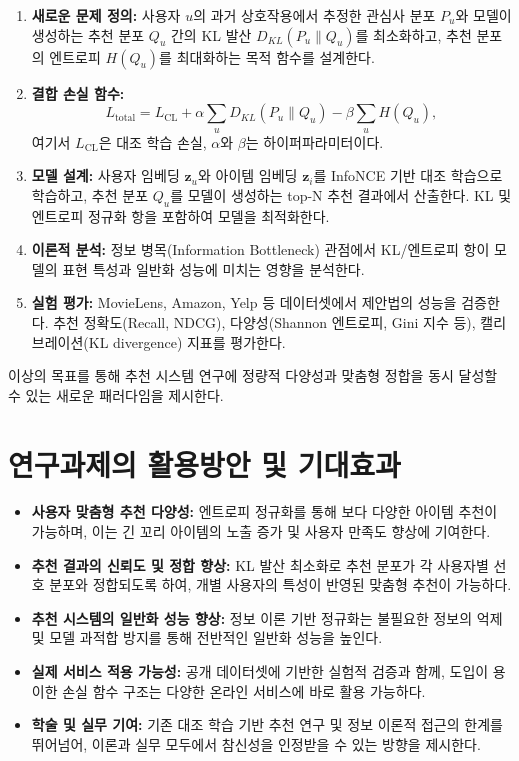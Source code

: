 \documentclass[a4paper, 12pt]{article}
\begin{document}
\begin{enumerate}[label={\arabic*.}]
    \item \textbf{새로운 문제 정의:} 사용자 $u$의 과거 상호작용에서 추정한 관심사 분포 $P_u$와 모델이 생성하는 추천 분포 $Q_u$ 간의 KL 발산 $D_{KL}(P_u \| Q_u)$를 최소화하고, 추천 분포의 엔트로피 $H(Q_u)$를 최대화하는 목적 함수를 설계한다.
    \item \textbf{결합 손실 함수:} 
    \[
    L_{\mathrm{total}} = L_{\mathrm{CL}} + \alpha \sum_u D_{KL}(P_u \| Q_u) - \beta \sum_u H(Q_u),
    \]
    여기서 $L_{\mathrm{CL}}$은 대조 학습 손실, $\alpha$와 $\beta$는 하이퍼파라미터이다.
    \item \textbf{모델 설계:} 사용자 임베딩 $\mathbf{z}_u$와 아이템 임베딩 $\mathbf{z}_i$를 InfoNCE 기반 대조 학습으로 학습하고, 추천 분포 $Q_u$를 모델이 생성하는 top-N 추천 결과에서 산출한다. KL 및 엔트로피 정규화 항을 포함하여 모델을 최적화한다.
    \item \textbf{이론적 분석:} 정보 병목(Information Bottleneck) 관점에서 KL/엔트로피 항이 모델의 표현 특성과 일반화 성능에 미치는 영향을 분석한다.
    \item \textbf{실험 평가:} MovieLens, Amazon, Yelp 등 데이터셋에서 제안법의 성능을 검증한다. 추천 정확도(Recall, NDCG), 다양성(Shannon 엔트로피, Gini 지수 등), 캘리브레이션(KL divergence) 지표를 평가한다.
\end{enumerate}

이상의 목표를 통해 추천 시스템 연구에 정량적 다양성과 맞춤형 정합을 동시 달성할 수 있는 새로운 패러다임을 제시한다.

\section*{연구과제의 활용방안 및 기대효과}

\begin{itemize}
    \item \textbf{사용자 맞춤형 추천 다양성:} 엔트로피 정규화를 통해 보다 다양한 아이템 추천이 가능하며, 이는 긴 꼬리 아이템의 노출 증가 및 사용자 만족도 향상에 기여한다.
    \item \textbf{추천 결과의 신뢰도 및 정합 향상:} KL 발산 최소화로 추천 분포가 각 사용자별 선호 분포와 정합되도록 하여, 개별 사용자의 특성이 반영된 맞춤형 추천이 가능하다.
    \item \textbf{추천 시스템의 일반화 성능 향상:} 정보 이론 기반 정규화는 불필요한 정보의 억제 및 모델 과적합 방지를 통해 전반적인 일반화 성능을 높인다.
    \item \textbf{실제 서비스 적용 가능성:} 공개 데이터셋에 기반한 실험적 검증과 함께, 도입이 용이한 손실 함수 구조는 다양한 온라인 서비스에 바로 활용 가능하다.
    \item \textbf{학술 및 실무 기여:} 기존 대조 학습 기반 추천 연구 및 정보 이론적 접근의 한계를 뛰어넘어, 이론과 실무 모두에서 참신성을 인정받을 수 있는 방향을 제시한다.
\end{itemize}
\end{document}

